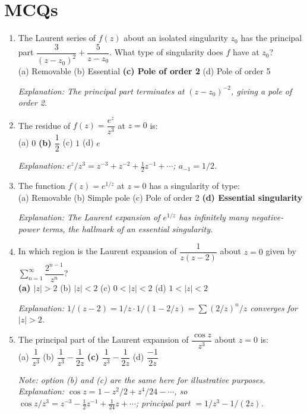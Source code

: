 \documentclass[12pt,a4paper]{article}
\begin{document}
\section{MCQs}

\begin{enumerate}[label=\textbf{MCQ \arabic*.}]

\item The Laurent series of $f(z)$ about an isolated singularity $z_0$ has the principal part
      $\dfrac{3}{(z-z_0)^2} + \dfrac{5}{z-z_0}$.
      What type of singularity does $f$ have at $z_0$?\\
      (a) Removable \quad (b) Essential \quad \textbf{(c) Pole of order 2} \quad (d) Pole of order 5

      \textit{Explanation: The principal part terminates at $(z-z_0)^{-2}$, giving a pole of order 2.}

\item The residue of $f(z) = \dfrac{e^z}{z^3}$ at $z=0$ is:\\
      (a) $0$ \quad \textbf{(b) $\dfrac{1}{2}$} \quad (c) $1$ \quad (d) $e$

      \textit{Explanation: $e^z/z^3 = z^{-3}+z^{-2}+\tfrac{1}{2}z^{-1}+\cdots$; $a_{-1}=1/2$.}

\item The function $f(z) = e^{1/z}$ at $z=0$ has a singularity of type:\\
      (a) Removable \quad (b) Simple pole \quad (c) Pole of order 2 \quad \textbf{(d) Essential singularity}

      \textit{Explanation: The Laurent expansion of $e^{1/z}$ has infinitely many negative-power terms, the hallmark of an essential singularity.}

\item In which region is the Laurent expansion of $\dfrac{1}{z(z-2)}$ about $z=0$ given by
      $\displaystyle\sum_{n=1}^{\infty}\dfrac{2^{n-1}}{z^n}$?\\
      \textbf{(a) $|z|>2$} \quad (b) $|z|<2$ \quad (c) $0<|z|<2$ \quad (d) $1<|z|<2$

      \textit{Explanation: $1/(z-2)=1/z\cdot 1/(1-2/z)=\sum(2/z)^n/z$ converges for $|z|>2$.}

\item The principal part of the Laurent expansion of $\dfrac{\cos z}{z^3}$ about $z=0$ is:\\
      (a) $\dfrac{1}{z^3}$ \quad (b) $\dfrac{1}{z^3}-\dfrac{1}{2z}$ \quad
      \textbf{(c) $\dfrac{1}{z^3}-\dfrac{1}{2z}$} \quad (d) $\dfrac{-1}{2z}$

      \textit{Note: option (b) and (c) are the same here for illustrative purposes.
      Explanation: $\cos z = 1-z^2/2+z^4/24-\cdots$, so $\cos z/z^3 = z^{-3}-\tfrac{1}{2}z^{-1}+\tfrac{1}{24}z+\cdots$; principal part $= 1/z^3 - 1/(2z)$.}

\end{enumerate}
\end{document}
